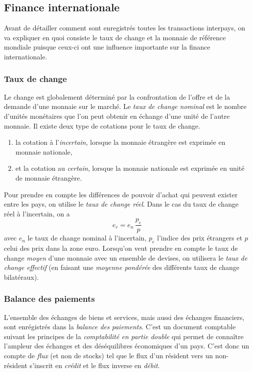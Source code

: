 
\subsection{Finance internationale} %
\label{sub:finance_internationale}
Avant de détailler comment sont enregistrés toutes les transactions interpays,
on va expliquer en quoi consiste le taux de change et la monnaie de référence mondiale
puisque ceux-ci ont une influence importante sur la finance internationale.

\subsubsection{Taux de change} %
\label{ssub:taux_de_change}
Le change est globalement déterminé par la confrontation de l'offre et
de la demande d'une monnaie sur le marché.
Le \emph{taux de change nominal} est le nombre d'unités monétaires que l'on 
peut obtenir en échange d'une unité de l'autre monnaie.
Il existe deux type de cotations pour le taux de change.
\begin{enumerate}
  \item la cotation à l'\emph{incertain}, lorsque la monnaie étrangère 
  est exprimée en monnaie nationale, %
  \item et la cotation au \emph{certain}, lorsque la monnaie nationale est exprimée
  en unité de monnaie étrangère. %
\end{enumerate}
Pour prendre en compte les différences de pouvoir d'achat qui peuvent exister entre les pays,
on utilise le \emph{taux de change réel}.
Dans le cas du taux de change réel à l'incertain, on a
\[
  e_r = e_n \, \frac{p_e}{p}
\]
avec $e_n$ le taux de change nominal à l'incertain, $p_e$ l'indice des prix étrangers
et $p$ celui des prix dans la zone euro.
Lorsqu'on veut prendre en compte le taux de change \emph{moyen} d'une monnaie
avec un ensemble de devises, on utilisera le \emph{taux de change effectif}
(en faisant une \emph{moyenne pondérée} des différents taux de change bilatéraux).


\subsubsection{Balance des paiements} %
\label{ssub:balance_des_paiements}
L'ensemble des échanges de biens et services, mais aussi des échanges financiers,
sont enrégistrés dans la \emph{balance des paiements}.
C'est un document comptable suivant les principes de la \emph{comptabilité en partie double}
qui permet de connaître l'ampleur des échanges et des déséquilibres économiques d'un pays.
C'est donc un compte de \emph{flux} (et non de stocks) tel que le flux d'un résident vers 
un non-résident s'inscrit en \emph{crédit} et le flux inverse en \emph{débit}.

